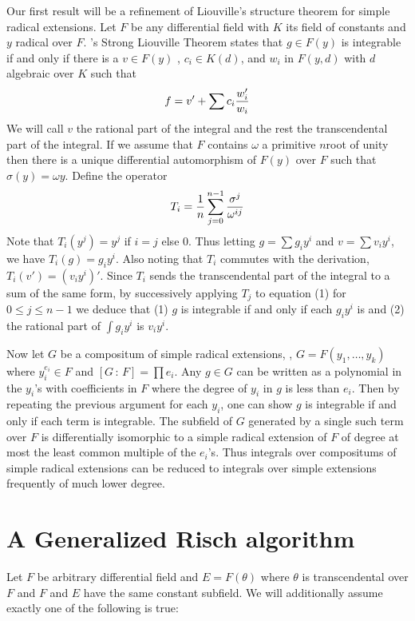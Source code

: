 Our first result will be a refinement of Liouville's structure
theorem for simple radical extensions.  Let $F$ be any differential
field with $K$ its field of constants and $y$ radical over $F$. 
{\Risch}'s Strong Liouville Theorem states that $g \in F(y)$ is
integrable if and only if there is a $v \in F(y)$ , $c_i \in K(d)$,
and $w_i$ in $F(y,d) $ with $d$ algebraic over $K$ such that
\begin{equation}
f = v' + \sum c_i {w_i' \over w_i} 
\label{Liouville:Eq}
\end{equation}
We will call $v$ the rational part of the integral and the rest
the transcendental part of the integral.
If we assume that $F$ contains $\omega$ a primitive $n$\th root of
unity then there is a unique differential automorphism of $F(y)$
over $F$ such that $\sigma (y) = \omega y$. Define the operator
\[
T_i = {1\over n} \sum_{j=0}^{n-1} {\sigma^j \over \omega^{ij}}
\]
Note that $T_i (y^j) = y^j$ if $i = j$ else 0.
Thus letting $g = \sum g_i y^i$ and $v = \sum v_i y^i$,
we have $T_i(g) = g_i y^i$.  Also noting that
$T_i$ commutes with the derivation, $T_i (v') = ( v_i 
y^i ) '$.  Since $T_i$ sends the transcendental part of 
the integral to a sum of the same form, by successively applying
$T_j$ to equation (1) for $0 \le j \le n-1$ we deduce
that (1) $g$ is integrable if and only if each $g_i y^i$ is
and (2) the rational part of $\int g_i y^i$ is $v_i y^i$.

Now let $G$ be a compositum of simple radical extensions, \ie,
$G = F(y_1 , \ldots , y_k )$ where $y_i^{ e_i } \in F$
and $[G \,:\, F] = \prod e_i$.  Any $g \in G$ can be written as a polynomial
in the $y_i$'s with coefficients in $F$ where the degree of $y_i$
in $g$ is less than $e_i$.  Then by repeating the previous argument
for each $y_i$, one can show $g$ is integrable if and only if each
term is integrable. The subfield of $G$ generated by a single such term
over $F$ is differentially isomorphic to a simple radical extension of 
$F$ of degree at most the least common multiple of the $e_i$'s.
Thus integrals over compositums of simple radical extensions
can be reduced to integrals over simple extensions 
frequently of much lower degree.

\section{A Generalized Risch algorithm}

Let $F$ be arbitrary differential field and $E=F(\theta)$ where $\theta$
is transcendental over $F$ and $F$ and $E$ have the same constant subfield.
We will additionally assume exactly one of the following is true:

